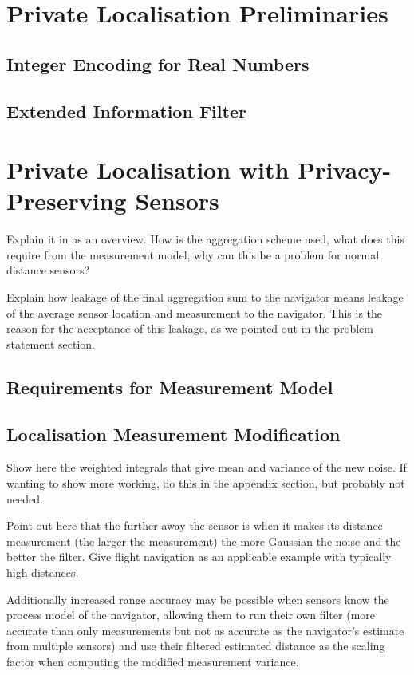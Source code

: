 \documentclass[twocolumn]{autart}    %
\begin{document}
\section{Private Localisation Preliminaries}

\subsection{Integer Encoding for Real Numbers}

\subsection{Extended Information Filter}


\section{Private Localisation with Privacy-Preserving Sensors}
Explain it in as an overview. How is the aggregation scheme used, what does this require from the measurement model, why can this be a problem for normal distance sensors?

Explain how leakage of the final aggregation sum to the navigator means leakage of the average sensor location and measurement to the navigator. This is the reason for the acceptance of this leakage, as we pointed out in the problem statement section.

\subsection{Requirements for Measurement Model}

\subsection{Localisation Measurement Modification}
Show here the weighted integrals that give mean and variance of the new noise. If wanting to show more working, do this in the appendix section, but probably not needed.

Point out here that the further away the sensor is when it makes its distance measurement (the larger the measurement) the more Gaussian the noise and the better the filter. Give flight navigation as an applicable example with typically high distances.

Additionally increased range accuracy may be possible when sensors know the process model of the navigator, allowing them to run their own filter (more accurate than only measurements but not as accurate as the navigator's estimate from multiple sensors) and use their filtered estimated distance as the scaling factor when computing the modified measurement variance.
\end{document}
